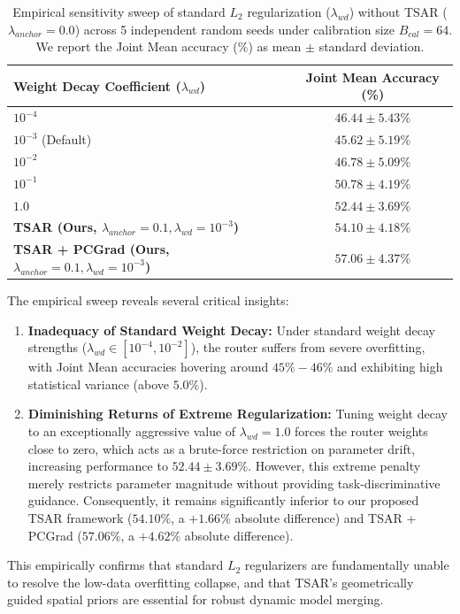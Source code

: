 \begin{table}[h]
\caption{Empirical sensitivity sweep of standard $L_2$ regularization ($\lambda_{wd}$) without TSAR ($\lambda_{anchor}=0.0$) across 5 independent random seeds under calibration size $B_{cal}=64$. We report the Joint Mean accuracy (\%) as mean $\pm$ standard deviation.}
\label{tab:l2_sweep}
\vskip 0.15in
\begin{center}
\begin{small}
\begin{sc}
\begin{tabular}{lc}
\toprule
Weight Decay Coefficient ($\lambda_{wd}$) & Joint Mean Accuracy (\%) \\
\midrule
$10^{-4}$ & $46.44 \pm 5.43\%$ \\
$10^{-3}$ (Default) & $45.62 \pm 5.19\%$ \\
$10^{-2}$ & $46.78 \pm 5.09\%$ \\
$10^{-1}$ & $50.78 \pm 4.19\%$ \\
$1.0$ & $52.44 \pm 3.69\%$ \\
\midrule
\textbf{TSAR (Ours, $\lambda_{anchor}=0.1, \lambda_{wd}=10^{-3}$)} & $\mathbf{54.10 \pm 4.18\%}$ \\
\textbf{TSAR + PCGrad (Ours, $\lambda_{anchor}=0.1, \lambda_{wd}=10^{-3}$)} & $\mathbf{57.06 \pm 4.37\%}$ \\
\bottomrule
\end{tabular}
\end{sc}
\end{small}
\end{center}
\vskip -0.1in
\end{table}

The empirical sweep reveals several critical insights:
\begin{enumerate}
    \item \textbf{Inadequacy of Standard Weight Decay:} Under standard weight decay strengths
($\lambda_{wd} \in [10^{-4}, 10^{-2}]$), the router suffers from severe overfitting, with Joint Mean
accuracies hovering around $45\% - 46\%$ and exhibiting high statistical variance (above $5.0\%$).
    \item \textbf{Diminishing Returns of Extreme Regularization:} Tuning weight decay to an
exceptionally aggressive value of $\lambda_{wd}=1.0$ forces the router weights close to zero, which
acts as a brute-force restriction on parameter drift, increasing performance to $52.44 \pm 3.69\%$.
However, this extreme penalty merely restricts parameter magnitude without providing
task-discriminative guidance. Consequently, it remains significantly inferior to our proposed TSAR
framework ($54.10\%$, a $+1.66\%$ absolute difference) and TSAR + PCGrad ($57.06\%$, a $+4.62\%$
absolute difference).
\end{enumerate}
This empirically confirms that standard $L_2$ regularizers are fundamentally unable to resolve the
low-data overfitting collapse, and that TSAR's geometrically guided spatial priors are essential for
robust dynamic model merging.

